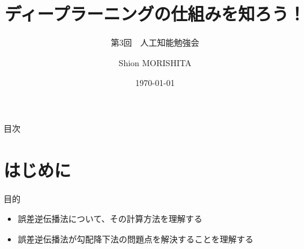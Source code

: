 \documentclass[dvipdfmx,aspectratio=169]{beamer}
\title{ディープラーニングの仕組みを知ろう！}
\subtitle{第3回　人工知能勉強会}
\author{Shion MORISHITA}
\institute{}
\date{\today}
\begin{document}
	\begin{frame}[plain]
	    \maketitle
	\end{frame}
		
	\begin{frame}[shrink]{目次}
		\vspace{1em}
		\tableofcontents
	\end{frame}
	
	\section{はじめに}
	\begin{frame}{目的}
		\begin{itemize}
			\item 誤差逆伝播法について、その計算方法を理解する
			\item 誤差逆伝播法が勾配降下法の問題点を解決することを理解する
		\end{itemize}
	\end{frame}
	
\end{document}
